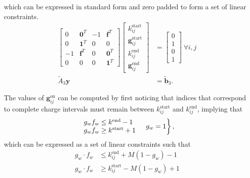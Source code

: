 which can be expressed in standard form and zero padded to form a set of linear constraints.
\begin{equation} \label{eqn:idxStart2}\begin{aligned}
	\begin{bmatrix} 0 & \mathbf{0}^T & -1 & \mathbf{f}^T \\
		        0 & \mathbf{1}^T &  0 & 0            \\
		       -1 & \mathbf{f}^T & 0 & \mathbf{0}^T  \\
		        0 & 0            & 0 & \mathbf{1}^T 
	\end{bmatrix} 
	\begin{bmatrix} k_{ij}^{\text{start}}       \\
		        \mathbf{g}_{ij}^{\text{start}} \\ 
			k_{ij}^{\text{end}}        \\ 
			\mathbf{g}_{ij}^{\text{end}} 
	\end{bmatrix} &= 
	\begin{bmatrix} 0 \\ 
			1 \\
	                0 \\
			1
	\end{bmatrix} \ \forall i,j \\
	\tilde{A}_3\mathbf{y} &= \tilde{\mathbf{b}}_3.
\end{aligned} \end{equation}

 The values of $\mathbf{g}_{ij}^{\text{on}}$ can be computed by first noticing that indices that correspond to complete charge intervals must remain between $k_{ij}^{\text{start}}$ and $k_{ij}^{\text{end}}$, implying that 
\begin{equation}\label{eqn:gOnCases}\begin{aligned}
	\begin{rcases}
		\begin{array}{ll}
			g_w f_w \le k^{\text{end}} - 1  \\
			g_w f_w \ge k^{\text{start}} + 1\\ 
		\end{array} & g_w = 1 \\
	\end{rcases},
\end{aligned} \end{equation}
which can be expressed as a set of linear constraints such that
\begin{equation} \label{eqn:gOnBigM}\begin{aligned}
	g_w\cdot f_w &\le k^{\text{end}}_{ij} + M(1 - g_w) - 1 \\
	g_w\cdot f_w &\ge k^{\text{start}}_{ij} - M(1 - g_w) + 1 \\ 
\end{aligned} \end{equation}
